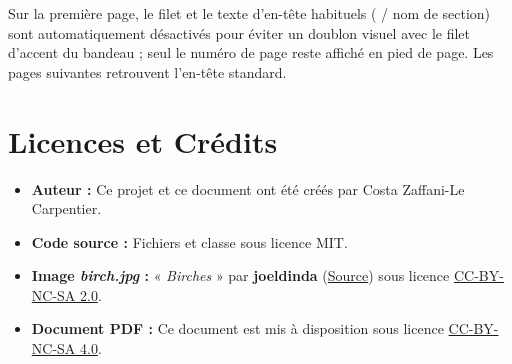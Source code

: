 \documentclass[theme=betula]{myrtille}
\begin{document}
Sur la première page, le filet et le texte d'en-tête habituels ( / nom de section) sont automatiquement désactivés pour éviter un doublon visuel avec le filet d'accent du bandeau ; seul le numéro de page reste affiché en pied de page. Les pages suivantes retrouvent l'en-tête standard.

\section{Licences et Crédits}
\begin{itemize}
    \item \textbf{Auteur :} Ce projet et ce document ont été créés par Costa Zaffani-Le Carpentier.
    \item \textbf{Code source :} Fichiers  et classe  sous licence MIT.
    \item \textbf{Image \textit{birch.jpg} :} « \textit{Birches} » par \textbf{joeldinda} (\href{https://www.flickr.com/photos/96739609@N00/9516542874}{Source}) sous licence \href{https://creativecommons.org/licenses/by-nc-sa/2.0/}{CC-BY-NC-SA 2.0}.
    \item \textbf{Document PDF :} Ce document est mis à disposition sous licence \href{https://creativecommons.org/licenses/by-nc-sa/4.0/deed.fr}{CC-BY-NC-SA 4.0}.
\end{itemize}
\end{document}
